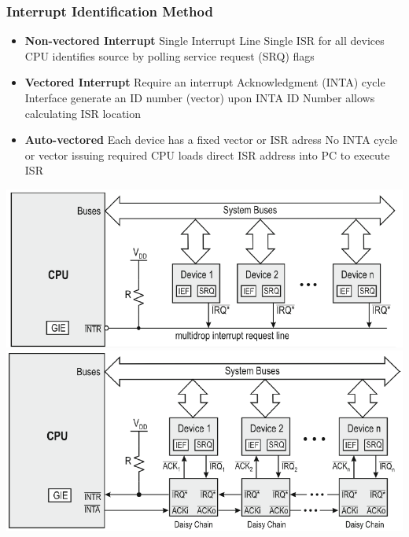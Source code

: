 \begin{minipage}{11cm}
\subsubsection{Interrupt Identification Method}
    \begin{itemize}
		\item \textbf{Non-vectored Interrupt}
		\subitem Single Interrupt Line
		\subitem Single \acs{ISR} for all devices
		\subitem \acs{CPU} identifies source by polling service request (\acs{SRQ}) flags
    \end{itemize}

    \begin{itemize}
		\item \textbf{Vectored Interrupt}
		\subitem Require an interrupt Acknowledgment (\acs{INTA}) cycle
		\subitem Interface generate an ID number (vector) upon \acs{INTA}
		\subitem ID Number allows calculating \acs{ISR} location
    \end{itemize}
	
    \begin{itemize}
	\item \textbf{Auto-vectored}
	\subitem Each device has a fixed vector or \acs{ISR} adress
	\subitem No \acs{INTA} cycle or vector issuing required
	\subitem \acs{CPU} loads direct \acs{ISR} address into \acs{PC} to execute \acs{ISR}
\end{itemize}
\end{minipage}
\begin{minipage}{8cm}
    \includegraphics[width=\linewidth]{images/nonvectored}
    \includegraphics[width=\linewidth]{images/vectored}
\end{minipage}

